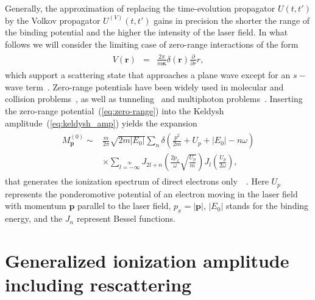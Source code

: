Generally, the approximation of replacing the time-evolution
propagator $U(t,t')$ by the Volkov propagator $U^{(V)}(t,t')$ gains in
precision the shorter the range of the binding potential and the
higher the intensity of the laser field. In what follows we will
consider the limiting case of zero-range interactions of the form
%
\begin{eqnarray}
\label{eq:zero-range}
\begin{split}
V(\mathbf{r}) & = & \frac{2\pi}{m\mathbf{\kappa}}
\delta(\mathbf{r}) \frac{\partial}{\partial r} r,
\end{split}
\end{eqnarray}
%
which support a scattering state that approaches a plane wave except
for an $s-$wave
term~\cite{Becker_rescattering1994,Becker_ati2002}. Zero-range
potentials have been widely used in molecular and collision
problems~\cite{zeroV_book1988,frolov_zeroV2013}, as well as
tunneling~\cite{Kleber_zeroV1994} and multiphoton
problems~\cite{Becker_zeroV1990}. Inserting the zero-range
potential~(\ref{eq:zero-range}) into the Keldysh
amplitude~(\ref{eq:keldysh_amp}) yields the expansion
%
\begin{eqnarray}
\label{eq:keldysh_amp_explicit}
\begin{split}
M_{\mathbf{p}}^{(0)} \sim &
\frac{m}{2\pi}\sqrt{2m|E_{0}|}
\sum\limits_{n} \delta\left(\frac{p^{2}}{2m} + U_{p} + |E_{0}| - n\omega\right) \\
& \times \sum\limits_{l=-\infty}\limits^{\infty} J_{2l+n}\left(\frac{2p_{x}}{\omega}
\sqrt{\frac{U_{p}}{m}} \right) J_{l}\left( \frac{U_{p}}{2\omega} \right),
\end{split}
\end{eqnarray}
%
that generates the ionization spectrum of direct electrons
only~~\cite{Kopold_1997sfa}. Here $U_{p}$ represents the ponderomotive
potential of an electron moving in the laser field with momentum
$\mathbf{p}$ parallel to the laser field, $p_{x} = |\mathbf{p}|$,
$|E_{0}|$ stands for the binding energy, and the $J_{n}$ represent
Bessel functions.


\section{\label{kopold_sfa} Generalized ionization amplitude including rescattering}

